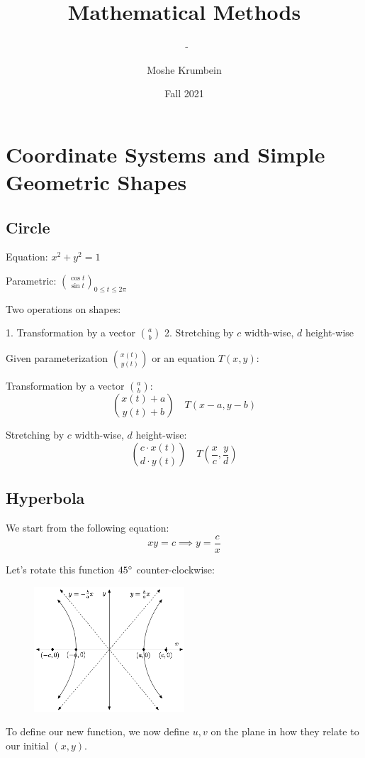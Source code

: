 \documentclass[00_complete]{subfiles}
\title{Mathematical Methods}
\author{Moshe Krumbein}
\date{Fall 2021}
\begin{document}
\setcounter{chapter}{1}

\chapter{Coordinate Systems and Simple Geometric Shapes}
\subtitle{\theauthor~- \thedate}

\section{Circle}

Equation: $x^2+y^2=1$

Parametric: $\binom{\cos t}{\sin t}_{0 \leq t \leq 2 \pi}$

Two operations on shapes:

1. Transformation by a vector $\binom{a}{b}$
2. Stretching by $c$ width-wise, $d$ height-wise

Given parameterization $\binom{x(t)}{y(t)}$ or an equation $T(x,y)$:

Transformation by a vector $\binom{a}{b}$:
$$\binom{x(t) + a}{y(t) + b} \quad T(x-a, y-b)$$

Stretching by $c$ width-wise, $d$ height-wise:
$$\binom{c \cdot x(t)}{d \cdot y(t)} \quad T\left(\frac{x}{c}, \frac{y}{d}\right)$$

\section{Hyperbola}
We start from the following equation:
$$xy=c \implies y=\frac{c}{x}$$

Let's rotate this function $45 \degree$ counter-clockwise:

\begin{figure}[ht]
    \centering
      \includegraphics[width=0.5\textwidth]{hyperbola}
\end{figure}

To define our new function, we now define ${u,v}$ on the plane in how they
relate to our initial $(x,y)$.
\end{document}
